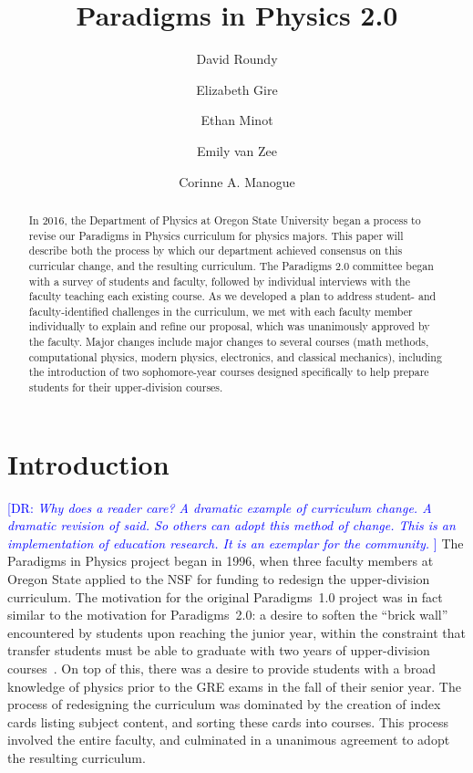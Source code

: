 \documentclass[english,aps,pra,reprint,noshowpacs,superscriptaddress]{revtex4-1}
\newcommand\davidsays[1]{\textcolor{blue}{[\sc DR: {\em#1}]}}
\begin{document}
\title{Paradigms in Physics 2.0}
\author{David Roundy}
\author{Elizabeth Gire}
\author{Ethan Minot}
\author{Emily van Zee}
\author{Corinne A. Manogue}


\begin{abstract}
In 2016, the Department of Physics at Oregon State University began a
process to revise our Paradigms in Physics curriculum for physics
majors.  This paper will describe both the process by which our
department achieved consensus on this curricular change, and the
resulting curriculum.  The Paradigms 2.0 committee began with a
survey of students and faculty, followed by individual interviews with
the faculty teaching each existing course.  As we developed a plan to
address student- and faculty-identified challenges in the curriculum,
we met with each faculty member individually to explain and refine our
proposal, which was unanimously approved by the faculty.  Major
changes include major changes to several courses (math
methods, computational physics, modern physics, electronics, and
classical mechanics), including the introduction of two sophomore-year
courses designed specifically to help prepare students for their
upper-division courses.
\end{abstract}

\maketitle
%
\section{Introduction}
\davidsays{Why does a reader care? A dramatic example of curriculum change.
A dramatic revision of said.  So others can adopt this method of change.  This is
an implementation of education research.  It is an exemplar for the community.
}
The Paradigms in Physics project began in 1996, when three faculty
members at Oregon State applied to the NSF for funding to redesign the
upper-division curriculum.  The motivation for the original Paradigms~1.0
project was in fact similar to the motivation for Paradigms~2.0: a
desire to soften the ``brick wall'' encountered by students upon
reaching the junior year, within the constraint that transfer students
must be able to graduate with two years of upper-division
courses~\cite{manogue2001paradigms}.  On top of this, there was a
desire to provide students with a broad knowledge of physics prior to
the GRE exams in the fall of their senior year.  The process of
redesigning the curriculum was dominated by the creation of index cards
listing subject content, and sorting these cards into courses.  This
process involved the entire faculty, and culminated in a unanimous
agreement to adopt the resulting curriculum.
\end{document}

